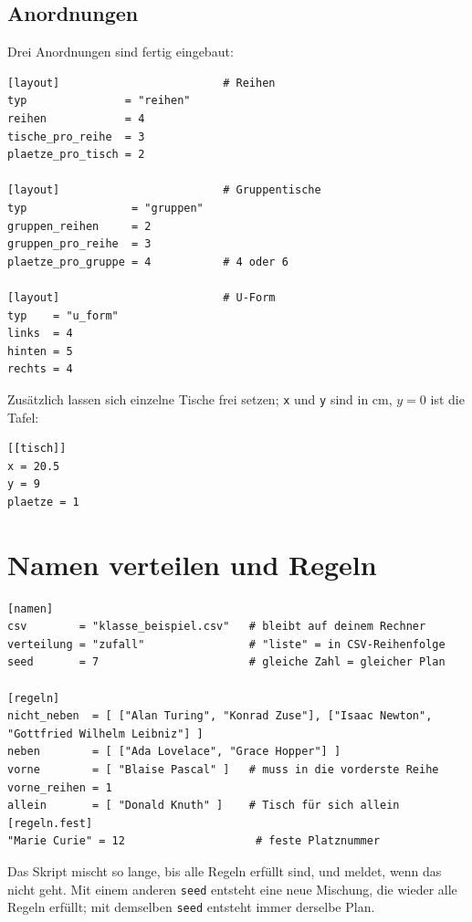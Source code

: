 \subsection{Anordnungen}

Drei Anordnungen sind fertig eingebaut:

\begin{lstlisting}[style=latex]
[layout]                         # Reihen
typ               = "reihen"
reihen            = 4
tische_pro_reihe  = 3
plaetze_pro_tisch = 2

[layout]                         # Gruppentische
typ                = "gruppen"
gruppen_reihen     = 2
gruppen_pro_reihe  = 3
plaetze_pro_gruppe = 4           # 4 oder 6

[layout]                         # U-Form
typ    = "u_form"
links  = 4
hinten = 5
rechts = 4
\end{lstlisting}

Zusätzlich lassen sich einzelne Tische frei setzen; \texttt{x} und \texttt{y} sind in cm, $y = 0$ ist die Tafel:

\begin{lstlisting}[style=latex]
[[tisch]]
x = 20.5
y = 9
plaetze = 1
\end{lstlisting}



\section{Namen verteilen und Regeln}

\begin{lstlisting}[style=latex]
[namen]
csv        = "klasse_beispiel.csv"   # bleibt auf deinem Rechner
verteilung = "zufall"                # "liste" = in CSV-Reihenfolge
seed       = 7                       # gleiche Zahl = gleicher Plan

[regeln]
nicht_neben  = [ ["Alan Turing", "Konrad Zuse"], ["Isaac Newton", "Gottfried Wilhelm Leibniz"] ]
neben        = [ ["Ada Lovelace", "Grace Hopper"] ]
vorne        = [ "Blaise Pascal" ]   # muss in die vorderste Reihe
vorne_reihen = 1
allein       = [ "Donald Knuth" ]    # Tisch für sich allein
[regeln.fest]
"Marie Curie" = 12                    # feste Platznummer
\end{lstlisting}

Das Skript mischt so lange, bis alle Regeln erfüllt sind, und meldet, wenn das nicht geht. Mit einem anderen \texttt{seed} entsteht eine neue Mischung, die wieder alle Regeln erfüllt; mit demselben \texttt{seed} entsteht immer derselbe Plan.


